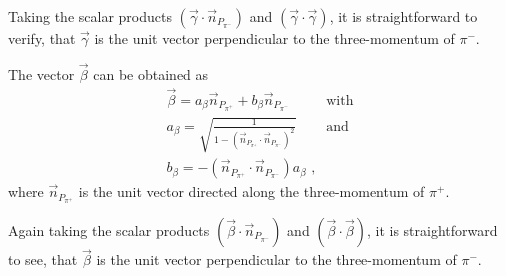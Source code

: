 Taking the scalar products $(\vec \gamma \cdot \vec
n_{P_{\pi^{-}}})$ and $(\vec \gamma \cdot \vec  \gamma)$,
it is straightforward to verify, that $\vec \gamma$ is the unit vector perpendicular to the three-momentum of $\pi^{-}$.

The vector $\vec \beta$ can be obtained as
\begin{eqnarray}
\vec \beta = a_{\beta}\vec n_{P_{\pi^{+}}} + b_{\beta}\vec n_{P_{\pi^{-}}} & \text{with} \nonumber \\
a_{\beta} = \sqrt{\frac{1}{1 - (\vec n_{P_{\pi^{+}}} \cdot \vec n_{P_{\pi^{-}}})^{2}}} & \text{and} \label{betavec}\\
b_{\beta} = - (\vec n_{P_{\pi^{+}}} \cdot \vec n_{P_{\pi^{-}}}) a_{\beta} \textrm{ ,} \nonumber
\end{eqnarray} 
where $\vec n_{P_{\pi^{+}}}$ is the unit vector directed along the three-momentum of $\pi^{+}$.

Again taking the scalar products $(\vec \beta \cdot \vec
n_{P_{\pi^{-}}})$ and $(\vec \beta \cdot \vec  \beta)$,
it is straightforward to see, that $\vec \beta$ is
the unit vector perpendicular to the 
three-momentum of $\pi^{-}$. 

